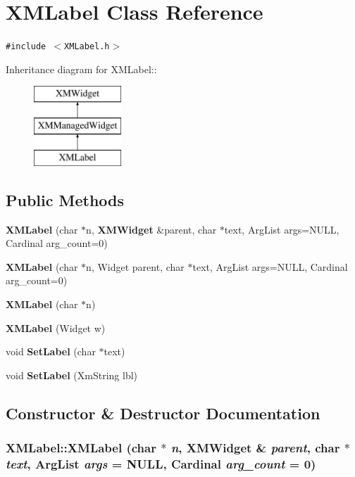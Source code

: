 \section{XMLabel  Class Reference}
\label{classXMLabel}
{\tt \#include $<$XMLabel.h$>$}

Inheritance diagram for XMLabel::\begin{figure}[H]
\begin{center}
\leavevmode
\includegraphics[height=3cm]{classXMLabel}
\end{center}
\end{figure}
\subsection*{Public Methods}
\begin{CompactItemize}
\item 
{\bf XMLabel} (char $\ast$n, {\bf XMWidget} \&parent, char $\ast$text, Arg\-List args=NULL, Cardinal arg\_\-count=0)
\item 
{\bf XMLabel} (char $\ast$n, Widget parent, char $\ast$text, Arg\-List args=NULL, Cardinal arg\_\-count=0)
\item 
{\bf XMLabel} (char $\ast$n)
\item 
{\bf XMLabel} (Widget w)
\item 
void {\bf Set\-Label} (char $\ast$text)
\item 
void {\bf Set\-Label} (Xm\-String lbl)
\end{CompactItemize}


\subsection{Constructor \& Destructor Documentation}
\subsubsection{\setlength{\rightskip}{0pt plus 5cm}XMLabel::XMLabel (char $\ast$ {\em n}, {\bf XMWidget} \& {\em parent}, char $\ast$ {\em text}, Arg\-List {\em args} = NULL, Cardinal {\em arg\_\-count} = 0)\hspace{0.3cm}{\tt  [inline]}}\label{classXMLabel_a0}




